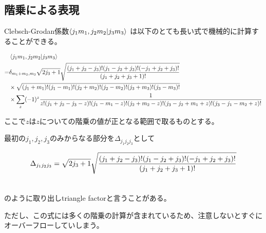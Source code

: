 \subsection{階乗による表現}

Clebsch-Grodan係数$\bra{j_1m_1,j_2m_2}\ket{j_3m_3}$
は以下のとても長い式で機械的に計算することができる。

\begin{align}\label{cg_fact}
    &\bra{j_1m_1, j_2m_2}\ket{j_3m_3} \\ \notag 
    = 
    &\delta_{m_1 + m_2, m_3}
    \sqrt{2j_3 + 1}
    \sqrt{\frac{(j_1 + j_2 - j_3)!(j_1 - j_2 + j_3)!(-j_1 + j_2 + j_3)!}{(j_1 + j_2 + j_3 + 1)!}}  \\ \notag
    &\times 
    \sqrt{(j_1 + m_1)!(j_1 -m_1)!(j_2 + m_2)!(j_2 - m_2)!(j_3 + m_3)!(j_3 - m_3)!} \\ \notag
    &\times
    \sum_z (-1)^z \frac{1}{z!(j_1 + j_2 - j_3 - z)!(j_1 - m_1 - z)!(j_2 + m_2 - z)!(j_3 - j_2 + m_1 + z)!(j_3 - j_1 - m_2 + z)!}
\end{align}

ここで$z$は$z$についての階乗の値が正となる範囲で取るものとする。

最初の$j_1,j_2,j_3$のみからなる部分を$\Delta_{j_1j_2j_3}$として

\begin{align}
    \Delta_{j_1j_2j_3} = \sqrt{2j_3 + 1}
    \sqrt{\frac{(j_1 + j_2 - j_3)!(j_1 - j_2 + j_3)!(-j_1 + j_2 + j_3)!}{(j_1 + j_2 + j_3 + 1)!}}  \\ \notag
\end{align}

のように取り出しtriangle factorと言うことがある。

ただし、この式には多くの階乗の計算が含まれているため、注意しないとすぐにオーバーフローしていしまう。
